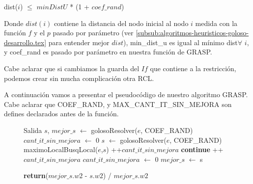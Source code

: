 \begin{center}
dist($i$) $\leq$ $minDistU$ * (1 + $coef\_rand$)
\end{center}

Donde $dist(i)$ contiene la distancia del nodo inicial al nodo $i$ medida con la función $f$ y el $p$ pasado por parámetro (ver \ref{subsub:algoritmos-heuristicos-goloso-desarrollo.tex} para entender mejor $dist$), min\_dist\_u es igual al mínimo dist$\forall$ $i$, y coef\_rand es pasado por parámetro en nuestra función de GRASP.

Cabe aclarar que si cambiamos la guarda del $If$ que contiene a la restricción, podemos crear sin mucha complicación otra RCL.

A continuación vamos a presentar el pseudocódigo de nuestro algoritmo GRASP. Cabe aclarar que COEF\_RAND, y MAX\_CANT\_IT\_SIN\_MEJORA son defines declarados antes de la función.

\begin{center}
 \begin{figure}[H]
  \begin{pseudo}
    \State Salida $s$, $mejor\_s$ $\leftarrow$ golosoResolver($e$, COEF\_RAND)
    \State $cant\_it\_sin\_mejora$ $\leftarrow$ 0   
      \State $s$ $\leftarrow$ golosoResolver($e$, COEF\_RAND)
      \State maximoLocalBusqLocal($e$,$s$)
	\State++$cant\_it\_sin\_mejora$
	\State \textbf{continue}
      \EndIf
	\State ++$cant\_it\_sin\_mejora$
      \Else
	\State $cant\_it\_sin\_mejora$ $\leftarrow$ 0
      \EndIf
	\State $mejor\_s$ $\leftarrow$ s
      \EndIf
    \EndWhile
    \EndProcedure
  \end{pseudo}
 \end{figure}
\end{center}

\begin{center}
 \begin{figure}[H]
  \begin{pseudo}
    \State \textbf{return}($mejor\_s.w2$ - $s.w2$) / $mejor\_s.w2$
  \EndProcedure
  \end{pseudo}
 \end{figure}
\end{center}